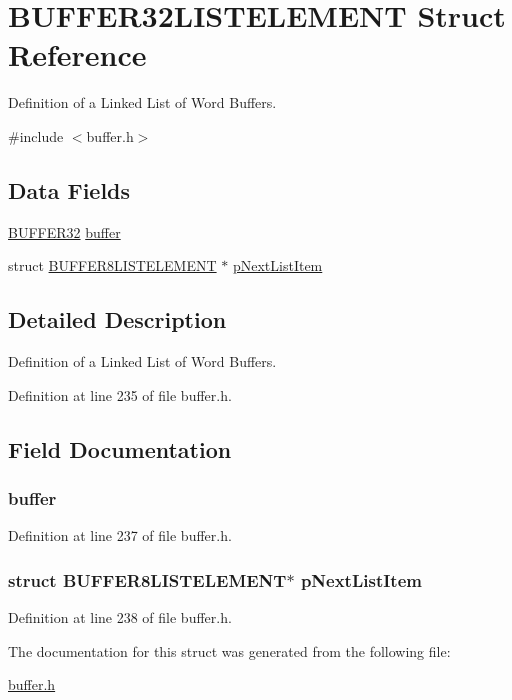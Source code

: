 \hypertarget{a00005}{
\section{BUFFER32LISTELEMENT Struct Reference}
\label{a00005}
}


Definition of a Linked List of Word Buffers.  




{\ttfamily \#include $<$buffer.h$>$}

\subsection*{Data Fields}
\begin{DoxyCompactItemize}
\item 
\hyperlink{a00004}{BUFFER32} \hyperlink{a00005_a789378f386053b37ba03aeb73f3efc84}{buffer}
\item 
struct \hyperlink{a00007}{BUFFER8LISTELEMENT} $\ast$ \hyperlink{a00005_ab55d6f070fed22a12c34e880f9a4b961}{pNextListItem}
\end{DoxyCompactItemize}


\subsection{Detailed Description}
Definition of a Linked List of Word Buffers. 

Definition at line 235 of file buffer.h.



\subsection{Field Documentation}
\hypertarget{a00005_a789378f386053b37ba03aeb73f3efc84}{
\subsubsection[{buffer}]{ {\bf buffer}}}
\label{a00005_a789378f386053b37ba03aeb73f3efc84}


Definition at line 237 of file buffer.h.

\hypertarget{a00005_ab55d6f070fed22a12c34e880f9a4b961}{
\subsubsection[{pNextListItem}]{\setlength{\rightskip}{0pt plus 5cm}struct {\bf BUFFER8LISTELEMENT}$\ast$ {\bf pNextListItem}}}
\label{a00005_ab55d6f070fed22a12c34e880f9a4b961}


Definition at line 238 of file buffer.h.



The documentation for this struct was generated from the following file:\begin{DoxyCompactItemize}
\item 
\hyperlink{a00465}{buffer.h}\end{DoxyCompactItemize}
